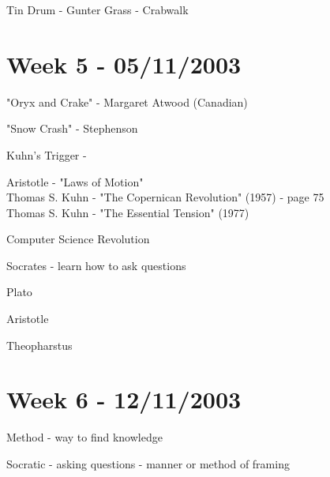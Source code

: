 \documentclass[a4paper,12pt]{article}
\begin{document}
\vspace{10mm}

\noindent Tin Drum - Gunter Grass - Crabwalk

\section*{Week 5 - 05/11/2003}

\noindent "Oryx and Crake" - Margaret Atwood (Canadian)

\vspace{10mm}

\noindent "Snow Crash" - Stephenson

\vspace{10mm}

\noindent Kuhn's Trigger - 

\vspace{10mm}

\noindent Aristotle - "Laws of Motion" \\
\noindent Thomas S. Kuhn - "The Copernican Revolution" (1957) - page 75 \\
\noindent Thomas S. Kuhn - "The Essential Tension" (1977)

\vspace{10mm}

\noindent Computer Science Revolution

\vspace{10mm}

\noindent Socrates - learn how to ask questions

\vspace{5mm}

\noindent Plato

\vspace{5mm}

\noindent Aristotle

\vspace{5mm}

\noindent Theopharstus

\section*{Week 6 - 12/11/2003}

\noindent Method - way to find knowledge

\vspace{10mm}

\noindent Socratic - asking questions - manner or method of framing

\vspace{10mm}
\end{document}
